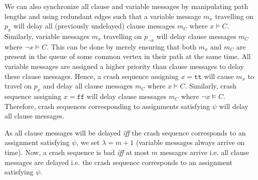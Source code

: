 \documentclass[11pt,eepic]{article}
\renewcommand{\tt}{\texttt{tt}}
\newcommand{\ff}{\texttt{ff}}
\begin{document}
	We can also synchronize all clause and variable messages by manipulating path lengths and using redundant edges such that a variable message $m_x$ travelling on $p_{x}$ will delay all (previously undelayed) clause messages $m_C$ where $x \models C$. Similarly, variable messages $m_x$ travelling on $p_{\neg x}$ will delay clause messages $m_C$ where $\neg x \models C$. This can be done by merely ensuring that both $m_x$ and $m_C$ are present in the queue of some common vertex in their path at the same time. All variable messages are assigned a higher priority than clause messages to delay these clause messages.
	Hence, a crash sequence assigning $x = \tt$ will cause $m_x$ to travel on $p_{x}$ and delay all clause messages $m_C$ where $x \models C$. Similarly, crash sequence assigning $x = \ff$ will delay clause messages $m_C$ where $\neg x \models C$. Therefore, crash sequences corresponding to assignments satisfying $\psi$ will delay all clause messages. 

	As all clause messages will be delayed {\it iff} the crash sequence corresponds to an assignment satisfying $\psi$, we set $\lambda = m+1$ (variable messages always arrive on time). Now, a crash sequence is bad {\it iff} at most $m$ messages arrive i.e. all clause messages are delayed i.e. the crash sequence corresponds to an assignment satisfying $\psi$.



\end{document}

